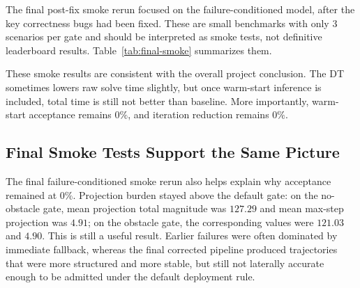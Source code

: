 The final post-fix smoke rerun focused on the failure-conditioned model, after the key correctness bugs had been fixed. These are small benchmarks with only 3 scenarios per gate and should be interpreted as smoke tests, not definitive leaderboard results. Table~\ref{tab:final-smoke} summarizes them.

\begin{table}[t]
\centering
\caption{Final post-fix smoke benchmark for the failure-conditioned fine-tune with \texttt{projection=soft}. Each gate has only 3 scenarios.}
\label{tab:final-smoke}
\small
\setlength{\tabcolsep}{4pt}
\end{table}

These smoke results are consistent with the overall project conclusion. The DT sometimes lowers raw solve time slightly, but once warm-start inference is included, total time is still not better than baseline. More importantly, warm-start acceptance remains $0\%$, and iteration reduction remains $0\%$.

\subsection{Final Smoke Tests Support the Same Picture}

The final failure-conditioned smoke rerun also helps explain why acceptance remained at $0\%$. Projection burden stayed above the default gate: on the no-obstacle gate, mean projection total magnitude was $127.29$ and mean max-step projection was $4.91$; on the obstacle gate, the corresponding values were $121.03$ and $4.90$. This is still a useful result. Earlier failures were often dominated by immediate fallback, whereas the final corrected pipeline produced trajectories that were more structured and more stable, but still not laterally accurate enough to be admitted under the default deployment rule.
